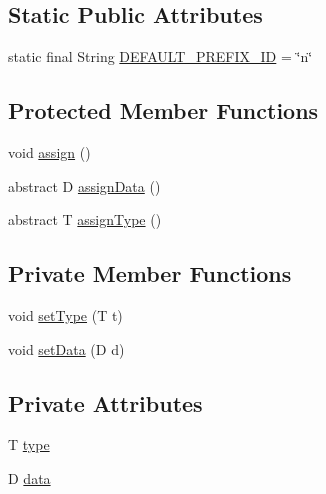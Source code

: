 \subsection*{Static Public Attributes}
\begin{DoxyCompactItemize}
\item 
static final String \hyperlink{classit_1_1emarolab_1_1cagg_1_1core_1_1language_1_1SyntaxNode_3_01T_01extends_01Enum_3_04_4_00_0ad1119718731d7a79caa8c8c39688664_a963add4a5bbcf3b4c976e4c97bbf0e41}{D\-E\-F\-A\-U\-L\-T\-\_\-\-P\-R\-E\-F\-I\-X\-\_\-\-I\-D} = \char`\"{}n\char`\"{}
\end{DoxyCompactItemize}
\subsection*{Protected Member Functions}
\begin{DoxyCompactItemize}
\item 
void \hyperlink{classit_1_1emarolab_1_1cagg_1_1core_1_1language_1_1SyntaxNode_3_01T_01extends_01Enum_3_04_4_00_0ad1119718731d7a79caa8c8c39688664_a60731795f3f4fa6e71f17d6ebaa51849}{assign} ()
\item 
abstract D \hyperlink{classit_1_1emarolab_1_1cagg_1_1core_1_1language_1_1SyntaxNode_3_01T_01extends_01Enum_3_04_4_00_0ad1119718731d7a79caa8c8c39688664_a60aee624ab34518f943c0039c916950d}{assign\-Data} ()
\item 
abstract T \hyperlink{classit_1_1emarolab_1_1cagg_1_1core_1_1language_1_1SyntaxNode_3_01T_01extends_01Enum_3_04_4_00_0ad1119718731d7a79caa8c8c39688664_aeab54d564e549598206be5524228bdcc}{assign\-Type} ()
\end{DoxyCompactItemize}
\subsection*{Private Member Functions}
\begin{DoxyCompactItemize}
\item 
void \hyperlink{classit_1_1emarolab_1_1cagg_1_1core_1_1language_1_1SyntaxNode_3_01T_01extends_01Enum_3_04_4_00_0ad1119718731d7a79caa8c8c39688664_a291f7da96bf66b8c04dc0b216950a1d7}{set\-Type} (T t)
\item 
void \hyperlink{classit_1_1emarolab_1_1cagg_1_1core_1_1language_1_1SyntaxNode_3_01T_01extends_01Enum_3_04_4_00_0ad1119718731d7a79caa8c8c39688664_a0a5f1796636521eb76815139e90d893b}{set\-Data} (D d)
\end{DoxyCompactItemize}
\subsection*{Private Attributes}
\begin{DoxyCompactItemize}
\item 
T \hyperlink{classit_1_1emarolab_1_1cagg_1_1core_1_1language_1_1SyntaxNode_3_01T_01extends_01Enum_3_04_4_00_0ad1119718731d7a79caa8c8c39688664_ac68b269ce1dcda0c97ae58cd7e61ba74}{type}
\item 
D \hyperlink{classit_1_1emarolab_1_1cagg_1_1core_1_1language_1_1SyntaxNode_3_01T_01extends_01Enum_3_04_4_00_0ad1119718731d7a79caa8c8c39688664_acfb9c0de69b4fb76b64df56ff8918aad}{data}
\end{DoxyCompactItemize}


